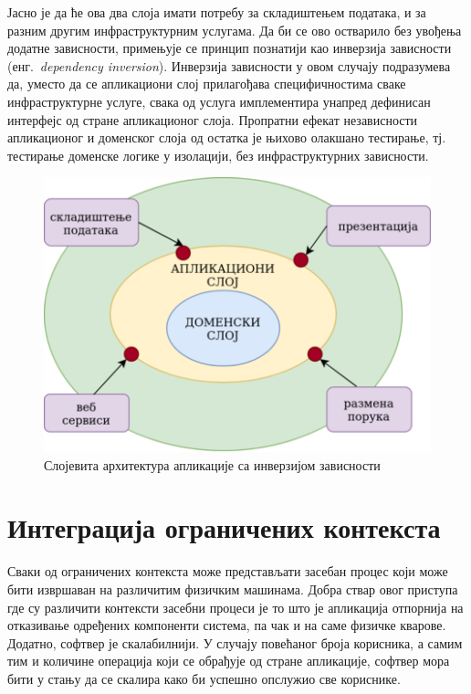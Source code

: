 \documentclass[12pt,oneside]{memoir}
\begin{document}
Јасно је да ће ова два слоја имати потребу за складиштењем података, и за разним другим инфраструктурним услугама. Да би се ово остварило без увођења додатне зависности, примењује се принцип познатији као инверзија зависности (енг.~\textit{dependency inversion}). Инверзија зависности у овом случају подразумева да, уместо да се апликациони слој прилагођава специфичностима сваке инфраструктурне услуге, свака од услуга имплементира унапред дефинисан интерфејс од стране апликационог слоја. Пропратни ефекат независности апликационог и доменског слоја од остатка је њихово олакшано тестирање, тј. тестирање доменске логике у изолацији, без инфраструктурних зависности.
\begin{figure}[!ht]
  \centering
  \includegraphics[scale=0.7]{slike/inverzija-zavisnosti.png}
  \caption{Слојевита архитектура апликације са инверзијом зависности}
  \label{fig:inverzijazavisnosti}
\end{figure}
\section{Интеграција ограничених контекста}\label{integracijaogranicenihkonteksta}
Сваки од ограничених контекста може представљати засебан процес који може бити извршаван на различитим физичким машинама. Добра ствар овог приступа где су различити контексти засебни процеси је то што је апликација отпорнија на отказивање одређених компоненти система, па чак и на саме физичке кварове. Додатно, софтвер је скалабилнији. У случају повећаног броја корисника, а самим тим и количине операција који се обрађује од стране апликације, софтвер мора бити у стању да се скалира како би успешно опслужио све кориснике.
\end{document}
